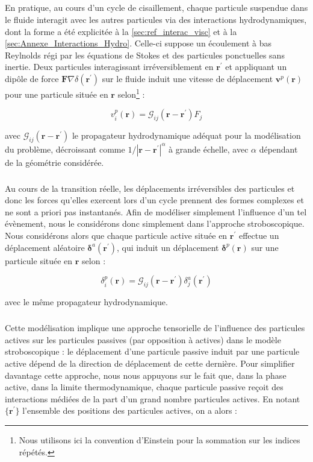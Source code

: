 \subparagraph{}En pratique, au cours d'un cycle de cisaillement, chaque particule suspendue dans le fluide interagit avec les autres particules via des interactions hydrodynamiques, dont la forme a été explicitée à la \autoref{sec:ref_interac_visc} et à la \autoref{sec:Annexe_Interactions_Hydro}. Celle-ci suppose un écoulement à bas Reylnolds régi par les équations de Stokes et des particules ponctuelles sans inertie. Deux particules interagissant irréversiblement en $\mathbf{r}^\prime$ et appliquant un dipôle de force $\mathbf{F}\nabla\delta(\mathbf{r}^\prime)$ sur le fluide induit une vitesse de déplacement $\mathbf{v}^p(\mathbf{r})$ pour une particule située en $\mathbf{r}$ selon\footnote{Nous utilisons ici la convention d'Einstein pour la sommation sur les indices répétés.} :

\begin{equation}
	v^p_i(\mathbf{r}) = \mathcal{G}_{ij}(\mathbf{r}-\mathbf{r}^\prime)F_j
\end{equation}

\noindent avec $\mathcal{G}_{ij}(\mathbf{r}-\mathbf{r}^\prime)$ le propagateur hydrodynamique adéquat pour la modélisation du problème, décroissant comme $1/|\mathbf{r}-\mathbf{r}^\prime|^\alpha$ à grande échelle, avec $\alpha$ dépendant de la géométrie considérée.

\subparagraph{}Au cours de la transition réelle, les déplacements irréversibles des particules et donc les forces qu'elles exercent lors d'un cycle prennent des formes complexes et ne sont a priori pas instantanés. Afin de modéliser simplement l'influence d'un tel évènement, nous le considérons donc simplement dans l'approche stroboscopique. Nous considérons alors que chaque particule active située en $\mathbf{r}^\prime$ effectue un déplacement aléatoire $\boldsymbol\delta^a(\mathbf{r}^\prime)$, qui induit un déplacement $\boldsymbol\delta^p(\mathbf{r})$ sur une particule située en $\mathbf{r}$ selon :

\begin{equation}
	\delta^p_i(\mathbf{r}) = \mathcal{G}_{ij}(\mathbf{r}-\mathbf{r}^\prime)\delta^a_j(\mathbf{r}^\prime)
\end{equation}

\noindent avec le même propagateur hydrodynamique.

\subparagraph{}Cette modélisation implique une approche tensorielle de l'influence des particules actives sur les particules passives (par opposition à actives) dans le modèle stroboscopique : le déplacement d'une particule passive induit par une particule active dépend de la direction de déplacement de cette dernière. Pour simplifier davantage cette approche, nous nous appuyons sur le fait que, dans la phase active, dans la limite thermodynamique, chaque particule passive reçoit des interactions médiées de la part d'un grand nombre particules actives. En notant $\{ \mathbf{r}^\prime \}$ l'ensemble des positions des particules actives, on a alors :

